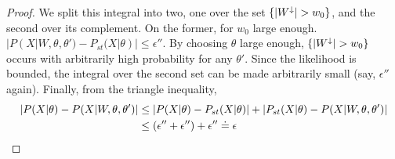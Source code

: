 \begin{proof}
We split this integral into two, one over the set $\{{|W^\downarrow}| > w_0\}$, and 
the second over its complement. On the former, for $w_0$ large enough. 
$|P(X |W, \theta, \theta')-P_{st}(X|\theta)|
\le \epsilon''$. %
By choosing $\theta$ large enough, $\{{|W^\downarrow}| > w_0\}$ occurs
with arbitrarily high probability for any $\theta'$. Since the likelihood is bounded, the
integral over the second set can be made arbitrarily small (say, $\epsilon''$ again). 
Finally, from the triangle
inequality,
\begin{align*}
|P(X | \theta) - P(X | W, \theta, \theta')| &\leq |P(X | \theta) -P_{st}(X | \theta) | + | P_{st}(X | \theta) -  P(X | W, \theta, \theta')|\\
       & \leq (\epsilon'' + \epsilon'') + \epsilon'' \doteq \epsilon
\end{align*}
\end{proof}

